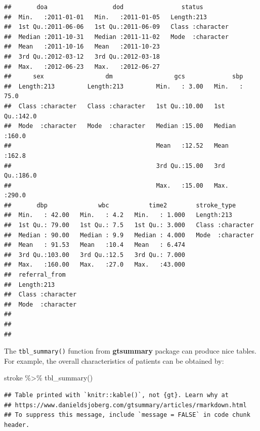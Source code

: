 \documentclass[
  10pt,
]{krantz}
\newenvironment{Shaded}{\begin{snugshade}}{\end{snugshade}}
\newcommand{\FunctionTok}[1]{\textcolor[rgb]{0.00,0.00,0.00}{#1}}
\newcommand{\NormalTok}[1]{#1}
\newcommand{\SpecialCharTok}[1]{\textcolor[rgb]{0.00,0.00,0.00}{#1}}
\begin{document}
\begin{verbatim}
##       doa                  dod                status         
##  Min.   :2011-01-01   Min.   :2011-01-05   Length:213        
##  1st Qu.:2011-06-06   1st Qu.:2011-06-09   Class :character  
##  Median :2011-10-31   Median :2011-11-02   Mode  :character  
##  Mean   :2011-10-16   Mean   :2011-10-23                     
##  3rd Qu.:2012-03-12   3rd Qu.:2012-03-18                     
##  Max.   :2012-06-23   Max.   :2012-06-27                     
##      sex                 dm                 gcs             sbp       
##  Length:213         Length:213         Min.   : 3.00   Min.   : 75.0  
##  Class :character   Class :character   1st Qu.:10.00   1st Qu.:142.0  
##  Mode  :character   Mode  :character   Median :15.00   Median :160.0  
##                                        Mean   :12.52   Mean   :162.8  
##                                        3rd Qu.:15.00   3rd Qu.:186.0  
##                                        Max.   :15.00   Max.   :290.0  
##       dbp              wbc           time2        stroke_type       
##  Min.   : 42.00   Min.   : 4.2   Min.   : 1.000   Length:213        
##  1st Qu.: 79.00   1st Qu.: 7.5   1st Qu.: 3.000   Class :character  
##  Median : 90.00   Median : 9.9   Median : 4.000   Mode  :character  
##  Mean   : 91.53   Mean   :10.4   Mean   : 6.474                     
##  3rd Qu.:103.00   3rd Qu.:12.5   3rd Qu.: 7.000                     
##  Max.   :160.00   Max.   :27.0   Max.   :43.000                     
##  referral_from     
##  Length:213        
##  Class :character  
##  Mode  :character  
##                    
##                    
## 
\end{verbatim}

The \texttt{tbl\_summary()} function from \textbf{gtsummary} package can produce nice tables. For example, the overall characteristics of patients can be obtained by:

\begin{Shaded}
\begin{Highlighting}[]
\NormalTok{stroke }\SpecialCharTok{\%\textgreater{}\%}
  \FunctionTok{tbl\_summary}\NormalTok{()}
\end{Highlighting}
\end{Shaded}

\begin{verbatim}
## Table printed with `knitr::kable()`, not {gt}. Learn why at
## https://www.danieldsjoberg.com/gtsummary/articles/rmarkdown.html
## To suppress this message, include `message = FALSE` in code chunk header.
\end{verbatim}
\end{document}
